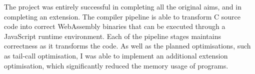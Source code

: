 \documentclass[20-proforma.tex]{subfiles}
\begin{document}
The project was entirely successful in completing all the original aims, and in completing an extension.
The compiler pipeline is able to transform C source code into correct WebAssembly binaries that can be executed through a JavaScript runtime environment.
Each of the pipeline stages maintains correctness as it transforms the code.
As well as the planned optimisations, such as tail-call optimisation, I was able to implement an additional extension optimisation, which significantly reduced the memory usage of programs.
\end{document}
